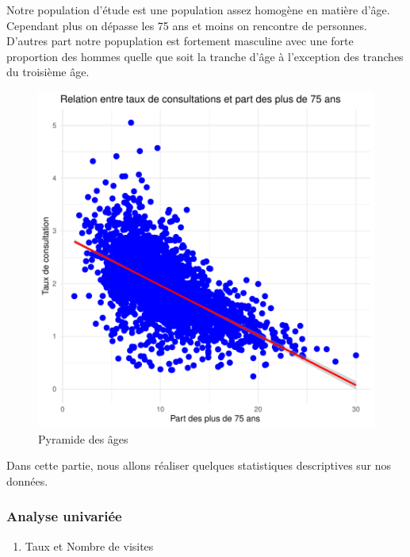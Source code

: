 \documentclass[
]{article}
\providecommand{\tightlist}{%
  \setlength{\itemsep}{0pt}\setlength{\parskip}{0pt}}
\begin{document}
Notre population d'étude est une population assez homogène en matière
d'âge. Cependant plus on dépasse les 75 ans et moins on rencontre de
personnes. D'autres part notre popuplation est fortement masculine avec
une forte proportion des hommes quelle que soit la tranche d'âge à
l'exception des tranches du troisième âge.

\begin{figure}

{\centering \includegraphics{Rapport_Projet_Stat_Ensai_files/figure-latex/unnamed-chunk-3-1} 

}

\caption{Pyramide des âges}\label{fig:unnamed-chunk-3}
\end{figure}

Dans cette partie, nous allons réaliser quelques statistiques
descriptives sur nos données.

\subsubsection{Analyse univariée}\label{analyse-univariuxe9e}

\begin{enumerate}
\def\labelenumi{\arabic{enumi}.}
\tightlist
\item
  Taux et Nombre de visites
\end{enumerate}
\end{document}
